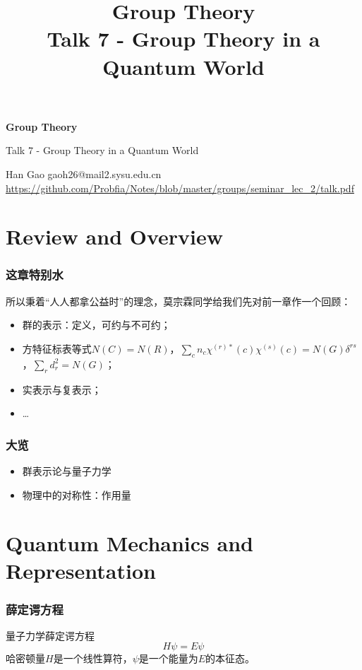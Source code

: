 \documentclass[CJK]{beamer}
\title{Group Theory\\ Talk 7 - Group Theory in a Quantum World}
\author{}
\date{}
\begin{document}
\begin{frame}
 
\begin{center}
\begin{Large}
\bch
{\bf Group Theory}

{\vskip 0.3in}

Talk 7 - Group Theory in a Quantum World

\ech
\end{Large}
\end{center}

\vskip 0.2in
\begin{center}
Han Gao
\vskip 0.1in
gaoh26@mail2.sysu.edu.cn
\vskip 0.2in
{\tiny \url{https://github.com/Probfia/Notes/blob/master/groups/seminar_lec_2/talk.pdf} }\\
\end{center}


\end{frame}

\section{Review and Overview}
\begin{frame}
\frametitle{\bch 这章特别水 \ech}
\bch
所以秉着“人人都拿公益时”的理念，莫宗霖同学给我们先对前一章作一个回顾：
\begin{itemize}
\item 群的表示：定义，可约与不可约；
\item 方特征标表等式$N(C) = N(R)$，$\sum_c n_c \chi^{(r)*} (c) \chi^{(s)}(c) = N(G)\delta^{rs}$，$\sum_r d_r^2 = N(G)$；
\item 实表示与复表示；
\item \dots
\end{itemize}
\ech
\end{frame}

\begin{frame}
\frametitle{\bch 大览 \ech}
\bch
\begin{itemize}
\item 群表示论与量子力学
\item 物理中的对称性：作用量
\end{itemize}
\ech
\end{frame}



\section{Quantum Mechanics and Representation}
\begin{frame}

\frametitle{\bch 薛定谔方程 \ech}
\bch
量子力学薛定谔方程
$$
H \psi = E \psi
$$
哈密顿量$H$是一个线性算符，$\psi$是一个能量为$E$的本征态。
\ech
\end{frame}
\end{document}
